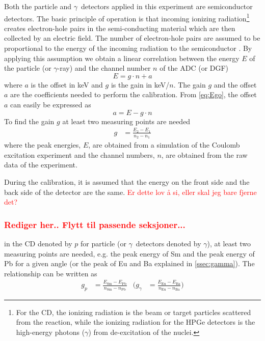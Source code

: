 \documentclass[twoside,english]{uiofysmaster/uiofysmaster}
\newcommand{\ga}{$\gamma$}
\let\orgautoref\autoref
\renewcommand{\autoref}
        {%
		 \def\sectionautorefname{Section}%
		 \def\subsectionautorefname{Section}%
		 \def\subsubsectionautorefname{Section}%
		 \def\chapterautorefname{Chapter}%
          \orgautoref}
\begin{document}
Both the particle and \ga\ detectors applied in this experiment are semiconductor detectors. 
The basic principle of operation is that incoming ionizing radiation\footnote{For the CD, the ionizing radiation is the beam or target particles scattered from the reaction, while the ionizing radiation for the HPGe detectors is the high-energy photons (\ga) from de-excitation of the nuclei.} creates electron-hole pairs in the semi-conducting material which are then collected by an electric field. 
The number of electron-hole pairs are assumed to be proportional to the energy of the incoming radiation to the semiconductor \cite{WRLeo}. 
By applying this assumption we obtain a linear correlation between the energy $E$ of the particle (or \ga-ray) and the channel number $n$ of the ADC (or DGF)
\begin{equation}\label{eq:Ego}
	E = g \cdot n + a
\end{equation}
where $a$ is the offset in keV and $g$ is the gain in keV/$n$. 
The gain $g$ and the offset $a$ are the coefficients needed to perform the calibration.
From \autoref{eq:Ego}, the offset $a$ can easily be expressed as 
\begin{equation}\label{eq:offset}
	a = E - g \cdot n 
\end{equation}
To find the gain $g$ at least two measuring points are needed
\begin{align}\label{eq:gain}
	g &= \frac{E_2 - E_1}{n_2 - n_1}
\end{align}
where the peak energies, $E$, are obtained from a simulation of the Coulomb excitation experiment and the channel numbers, $n$, are obtained from the raw data of the experiment.

During the calibration, it is assumed that the energy on the front side and the back side of the detector are the same. \textcolor{red}{Er dette lov å si, eller skal jeg bare fjerne det?}


\subsubsection*{\textcolor{red}{Rediger her.. Flytt til passende seksjoner...}}
 in the CD denoted by $p$ for particle (or \ga\ detectors denoted by \ga), at least two measuring points are needed, e.g. the peak energy of Sm and the peak energy of Pb for a given angle (or the peak of Eu and Ba explained in \autoref{ssec:gamma}). 
The relationship can be written as 
\begin{align}
	g_p &= \frac{E_{\text{Sm}} - E_{\text{Pb}}}{n_{\text{Sm}} - n_{\text{Pb}}}
	&
	\Bigg( g_\gamma &= \frac{E_{\text{Eu}} - E_{\text{Ba}}}{n_{\text{Eu}} - n_{\text{Ba}}} \Bigg)
\end{align}
\end{document}
